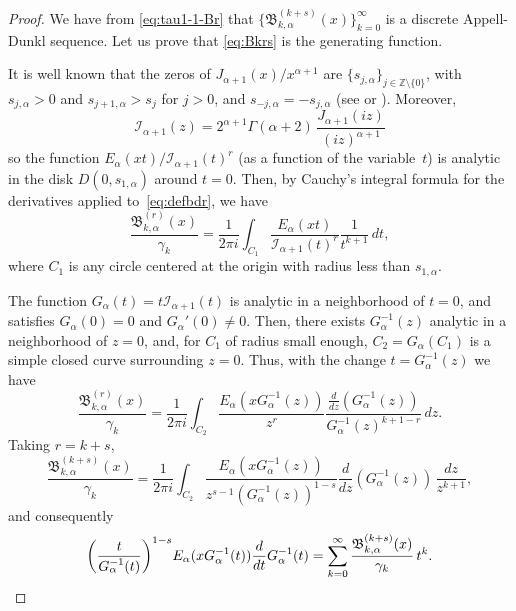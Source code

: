 \documentclass[11pt]{article}
\theoremstyle{plain}
\theoremstyle{remark}
\numberwithin{equation}{section} %
\newcommand{\Ea}{E_{\alpha}}
\newcommand{\I}{\mathcal{I}}
\newcommand{\B}{\mathfrak{B}}
\newcommand{\ZZO}{\mathbb{Z} \setminus \{0\}}
\newcommand{\cc}{\gamma}
\begin{document}
\begin{proof}
We have from \eqref{eq:tau1-1-Br} that $\{\B_{k,\alpha}^{(k+s)}(x)\}_{k=0}^{\infty}$ is a discrete Appell-Dunkl sequence. Let us prove that \eqref{eq:Bkrs} is the generating function.

It is well known that the zeros of $J_{\alpha+1}(x)/x^{\alpha+1}$ are $\{s_{j,\alpha}\}_{j\in\ZZO}$, with $s_{j,\alpha} > 0$ and $s_{j+1,\alpha} > s_j$ for $j > 0$, and $s_{-j,\alpha}=-s_{j,\alpha}$ (see \cite[Chapter~15]{Wat} or \cite[\S\,10.21]{OlMa-NIST}). Moreover,
\[
  \I_{\alpha+1}(z)
  = 2^{\alpha+1} \Gamma(\alpha+2)\, \frac{J_{\alpha+1}(iz)}{(iz)^{\alpha+1}}
\]
so the function ${\Ea(xt)}/{\I_{\alpha+1}(t)^r}$ (as a function of the variable~$t$) is analytic in the disk $D(0,s_{1,\alpha})$ around $t=0$.
Then, by Cauchy's integral formula for the derivatives applied to~\eqref{eq:defbdr}, we have
\[
\frac{\B_{k,\alpha}^{(r)}(x)}{\cc_k}
= \frac{1}{2\pi i} \int_{C_1} \frac{\Ea(xt)}{\I_{\alpha+1}(t)^r} \frac{1}{t^{k+1}}\,dt,
\]
where $C_1$ is any circle centered at the origin with radius less than $s_{1,\alpha}$. 

The function $G_{\alpha}(t) = t\I_{\alpha+1}(t)$ is analytic in a neighborhood of $t=0$, and satisfies $G_{\alpha}(0)=0$ and $G_{\alpha}'(0)\ne 0$. Then, there exists $G_{\alpha}^{-1}(z)$ analytic in a neighborhood of $z=0$, and, for $C_1$ of radius small enough, $C_2 = G_{\alpha}(C_1)$ is a simple closed curve surrounding $z=0$. Thus, with the change $t = G_{\alpha}^{-1}(z)$ we have
\[
\frac{\B_{k,\alpha}^{(r)}(x)}{\cc_k}
= \frac{1}{2\pi i} \int_{C_2} \frac{\Ea(xG_{\alpha}^{-1}(z))}{z^r}
\frac{\frac{d}{dz}(G_{\alpha}^{-1}(z))}{G_{\alpha}^{-1}(z)^{k+1-r}}\,dz.
\]
Taking $r=k+s$, 
\[
\frac{\B_{k,\alpha}^{(k+s)}(x)}{\cc_k}
= \frac{1}{2\pi i} \int_{C_2} \frac{\Ea(xG_{\alpha}^{-1}(z))}{z^{s-1}(G_{\alpha}^{-1}(z))^{1-s}}
\frac{d}{dz}(G_{\alpha}^{-1}(z))\,\frac{dz}{z^{k+1}},
\]
and consequently 
\[
\bigg(\frac{t}{G_{\alpha}^{-1}(t)}\bigg)^{1-s} \Ea(xG_{\alpha}^{-1}(t)) 
\frac{d}{dt}G_{\alpha}^{-1}(t)
= \sum_{k=0}^{\infty}\frac{\B_{k,\alpha}^{(k+s)}(x)}{\cc_k} \,t^k.
\qedhere
\]
\end{proof}
\end{document}

